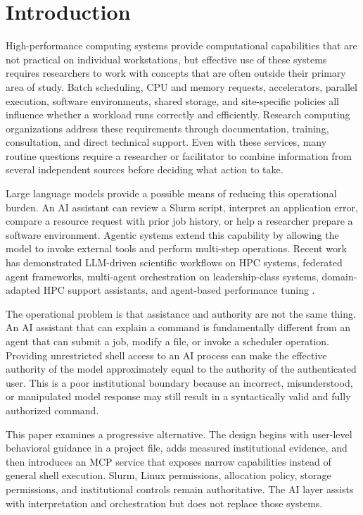 \documentclass[11pt]{article}
\begin{document}
\section{Introduction}

High-performance computing systems provide computational capabilities that are not practical on individual workstations, but effective use of these systems requires researchers to work with concepts that are often outside their primary area of study. Batch scheduling, CPU and memory requests, accelerators, parallel execution, software environments, shared storage, and site-specific policies all influence whether a workload runs correctly and efficiently. Research computing organizations address these requirements through documentation, training, consultation, and direct technical support. Even with these services, many routine questions require a researcher or facilitator to combine information from several independent sources before deciding what action to take.

Large language models provide a possible means of reducing this operational burden. An AI assistant can review a Slurm script, interpret an application error, compare a resource request with prior job history, or help a researcher prepare a software environment. Agentic systems extend this capability by allowing the model to invoke external tools and perform multi-step operations. Recent work has demonstrated LLM-driven scientific workflows on HPC systems, federated agent frameworks, multi-agent orchestration on leadership-class systems, domain-adapted HPC support assistants, and agent-based performance tuning \cite{ma2025hpcagent,kamatar2026academy,pham2026multiagent,shahin2026hpcllm,hayashi2025vibecodehpc}.

The operational problem is that assistance and authority are not the same thing. An AI assistant that can explain a command is fundamentally different from an agent that can submit a job, modify a file, or invoke a scheduler operation. Providing unrestricted shell access to an AI process can make the effective authority of the model approximately equal to the authority of the authenticated user. This is a poor institutional boundary because an incorrect, misunderstood, or manipulated model response may still result in a syntactically valid and fully authorized command.

This paper examines a progressive alternative. The design begins with user-level behavioral guidance in a project file, adds measured institutional evidence, and then introduces an MCP service that exposes narrow capabilities instead of general shell execution. Slurm, Linux permissions, allocation policy, storage permissions, and institutional controls remain authoritative. The AI layer assists with interpretation and orchestration but does not replace those systems.
\end{document}
